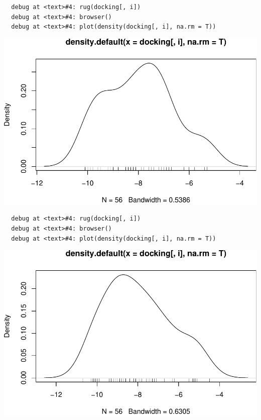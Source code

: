\documentclass[12pt,twoside]{reedthesis}
\begin{document}
  \begin{verbatim}
  debug at <text>#4: rug(docking[, i])
  debug at <text>#4: browser()
  debug at <text>#4: plot(density(docking[, i], na.rm = T))
  \end{verbatim}
  
  \begin{center}\includegraphics{tesis_files/figure-latex/johan-16} \end{center}
  
  \begin{verbatim}
  debug at <text>#4: rug(docking[, i])
  debug at <text>#4: browser()
  debug at <text>#4: plot(density(docking[, i], na.rm = T))
  \end{verbatim}
  
  \begin{center}\includegraphics{tesis_files/figure-latex/johan-17} \end{center}
  
\end{document}
